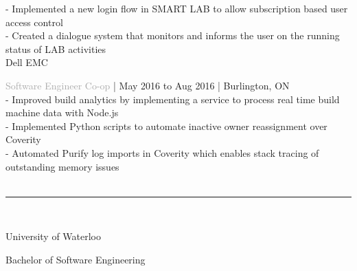 \documentclass[12pt]{article}
\newcommand{\cvsection}[1]{
    \\[0.2in]
    \indent \fontsize{18}{18}\selectfont{#1}
    \noindent\rule{\textwidth}{1pt}\\[0.1in]
    \fontsize{12}{15}\selectfont
}
\newcommand{\cmpname}[1]{
    \fontsize{15}{15}\selectfont
    \indent #1 \\[0.03in]
    \fontsize{12}{15}\selectfont
}
\newcommand{\position}[3]{
    \fontsize{12}{15}\selectfont
    \indent \textcolor{darkgray}{#1}
    \fontsize{10}{12}\selectfont
    | #2 | #3 \\[0.04in]
}
\newcommand{\secbullet}[1]{
    \fontsize{12}{15}\selectfont
    \indent - #1\\[0.02in]
}
\newcommand{\secendbullet}[1]{
    \fontsize{12}{15}\selectfont
    \indent - #1\\[0.1in]
}
\newcommand{\cvsubsection}[1]{
    \fontsize{12}{15}\selectfont
    \indent #1\\
}
\begin{document}
\secbullet{Implemented a new login flow in SMART LAB to allow subscription based user access control}
\secendbullet{Created a dialogue system that monitors and informs the user on the running status of LAB activities}
\cmpname{Dell EMC}
\position{Software Engineer Co-op}{May 2016 to Aug 2016}{Burlington, ON}
\secbullet{Improved build analytics by implementing a service to process real time build machine data with Node.js}
\secbullet{Implemented Python scripts to automate inactive owner reassignment over Coverity}
\secbullet{Automated Purify log imports in Coverity which enables stack tracing of outstanding memory issues}
\cvsection{Education}
\cmpname{University of Waterloo}
\cvsubsection{Bachelor of Software Engineering}
\end{document}
